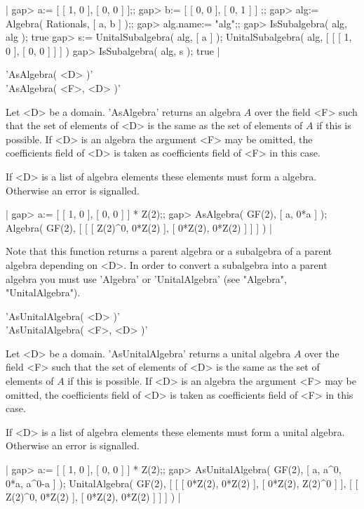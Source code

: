 |    gap> a:= [ [ 1, 0 ], [ 0, 0 ] ];;
    gap> b:= [ [ 0, 0 ], [ 0, 1 ] ] ;;
    gap> alg:= Algebra( Rationals, [ a, b ] );;
    gap> alg.name:= "alg";;
    gap> IsSubalgebra( alg, alg );
    true
    gap> s:= UnitalSubalgebra( alg, [ a ] );
    UnitalSubalgebra( alg, [ [ [ 1, 0 ], [ 0, 0 ] ] ] )
    gap> IsSubalgebra( alg, s );
    true |


'AsAlgebra( <D> )' \\
'AsAlgebra( <F>, <D> )'

Let <D> be a domain. 'AsAlgebra' returns an algebra $A$ over the field <F>
such that the set of elements of <D> is the same as the set of elements of
$A$ if this is possible.
If <D> is an algebra the argument <F> may be omitted, the coefficients
field of <D> is taken as coefficients field of <F> in this case.

If <D> is a list of algebra elements these elements must form a algebra.
Otherwise an error is signalled.

|    gap> a:= [ [ 1, 0 ], [ 0, 0 ] ] * Z(2);;
    gap> AsAlgebra( GF(2), [ a, 0*a ] );
    Algebra( GF(2), [ [ [ Z(2)^0, 0*Z(2) ], [ 0*Z(2), 0*Z(2) ] ] ] ) |

Note that this function returns a parent algebra or a subalgebra  of a
parent algebra  depending on <D>. In order  to convert a   subalgebra
into a parent algebra you must use 'Algebra' or 'UnitalAlgebra' (see
"Algebra", "UnitalAlgebra").


'AsUnitalAlgebra( <D> )' \\
'AsUnitalAlgebra( <F>, <D> )'

Let <D> be a domain. 'AsUnitalAlgebra' returns a unital algebra $A$ over
the field <F> such that the set of elements of <D> is the same as the set
of elements of $A$ if this is possible.
If <D> is an algebra the argument <F> may be omitted, the coefficients
field of <D> is taken as coefficients field of <F> in this case.

If <D> is a list of algebra elements these elements must form a unital
algebra.  Otherwise an error is signalled.

|    gap> a:= [ [ 1, 0 ], [ 0, 0 ] ] * Z(2);;
    gap> AsUnitalAlgebra( GF(2), [ a, a^0, 0*a, a^0-a ] );
    UnitalAlgebra( GF(2), [ [ [ 0*Z(2), 0*Z(2) ], [ 0*Z(2), Z(2)^0 ] ],
      [ [ Z(2)^0, 0*Z(2) ], [ 0*Z(2), 0*Z(2) ] ] ] ) |

